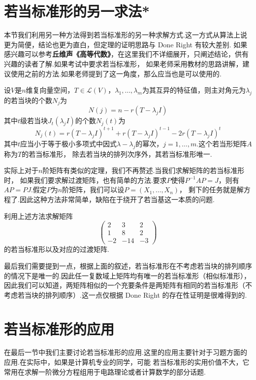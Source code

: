 \section{若当标准形的另一求法*}\label{sect:18:若当标准形的另一求法}
本节我们利用另一种方法得到若当标准形的另一种求解方式.这一方式从算法上说更为简便，结论也更为直白，但定理的证明思路与 Done Right 有较大差别.
如果感兴趣可以参考\textbf{丘维声《高等代数》}，在这里我们不详细展开，只阐述结论，供有兴趣的读者了解.如果考试中要求若当标准形，
如果老师采用教材的思路讲解，建议使用之前的方法.如果老师提到了这一角度，那么应当也是可以使用的.
\begin{theorem}
    设$V$是$n$维复向量空间，$T\in \mathcal{L}(V)$，$\lambda_1,\ldots,\lambda_m$为其互异的特征值，则主对角元为$\lambda_j$的若当块的个数$N_j$为
    \[N(j)=n-r(T-\lambda_jI)\]
    其中$t$级若当块$J_t(\lambda_jI)$的个数$N_j(t)$为
    \[N_j(t)=r(T-\lambda_jI)^{t+1}+r(T-\lambda_jI)^{t-1}-2r(T-\lambda_jI)^t\]
    其中$t$应当小于等于极小多项式中因式$\lambda-\lambda_j$的幂次，$j=1,\ldots,m$.这个若当形矩阵$A$称为$T$的若当标准形，
    除去若当块的排列次序外，其若当标准形唯一.
\end{theorem}
实际上对于$n$阶矩阵有类似的定理，我们不再赘述.当我们求解矩阵的若当标准形时，
如果我们要求解过渡矩阵，也有简单的方法.要求$P$使得$P^{-1}AP=J$，则有$AP=PJ$.假定$P$为$n$阶矩阵，我们可以设$P=(X_1,\ldots,X_n)$，
剩下的任务就是解方程了.因此这种方法非常简单，缺陷在于绕开了若当基这一本质的问题.
\begin{example}
    利用上述方法求解矩阵\[\begin{pmatrix}
        2 & 3 & 2 \\ 1 & 8 & 2 \\ -2 & -14 & -3
    \end{pmatrix}\]的若当标准形以及对应的过渡矩阵.
\end{example}
最后我们需要提到一点，根据上面的叙述，若当标准形在不考虑若当块的排列顺序的情况下是唯一的.因此任一复数域上矩阵均有唯一的若当标准形（相似标准形），
因此我们可以知道，两矩阵相似的一个充要条件是两矩阵有相同的若当标准形（不考虑若当块的排列顺序）.这一点仅根据 Done Right 的存在性证明是很难得到的.

\section{若当标准形的应用}
在最后一节中我们主要讨论若当标准形的应用.这里的应用主要针对于习题方面的应用.在实际中，如果是计算机专业的同学，可能
若当标准形的实用价值不大，它常用在求解一阶微分方程组用于电路理论或者计算数学的部分话题.


